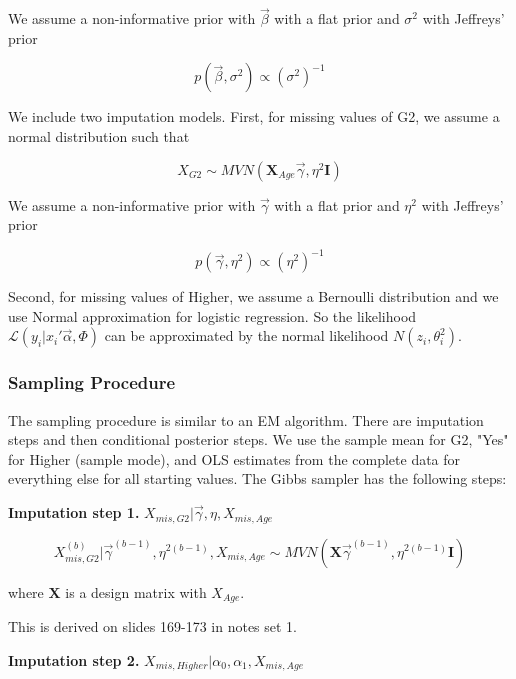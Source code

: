 \documentclass[11pt]{article}
\begin{document}
We assume a non-informative prior with $\vec{\beta}$ with a flat prior and $\sigma^2$ with Jeffreys' prior

$$p(\vec{\beta}, \sigma^2) \propto (\sigma^2)^{-1}$$

\vspace{0.25in}

We include two imputation models. First, for missing values of G2, we assume a normal distribution such that

$$X_{G2} \sim MVN(\mathbf{X}_{Age}\vec{\gamma}, \eta^2\mathbf{I})$$

We assume a non-informative prior with $\vec{\gamma}$ with a flat prior and $\eta^2$ with Jeffreys' prior

$$p(\vec{\gamma}, \eta^2) \propto (\eta^2)^{-1}$$

\vspace{0.25in}

Second, for missing values of Higher, we assume a Bernoulli distribution and we use Normal approximation for logistic regression. So the likelihood $\mathcal{L}(y_i|x_i'\vec\alpha, \Phi)$ can be approximated by the normal likelihood $N(z_i, \theta^2_i)$.

\subsubsection{Sampling Procedure}

The sampling procedure is similar to an EM algorithm. There are imputation steps and then conditional posterior steps. We use the sample mean for G2, "Yes" for Higher (sample mode), and OLS estimates from the complete data for everything else for all starting values. The Gibbs sampler has the following steps:

\vspace{0.25in}

\textbf{Imputation step 1.} $X_{mis, G2}|\vec\gamma, \eta, X_{mis, Age}$

$$X_{mis, G2}^{(b)}|\vec\gamma^{(b - 1)}, \eta^{2(b - 1)}, X_{mis, Age} \sim MVN(\mathbf{X}\vec{\gamma}^{(b - 1)}, \eta^{2(b - 1)}\mathbf{I})$$

where $\mathbf{X}$ is a design matrix with $X_{Age}$.

This is derived on slides 169-173 in notes set 1.

\vspace{0.25in}

\textbf{Imputation step 2.} $X_{mis, Higher}|\alpha_0, \alpha_1, X_{mis, Age}$
\end{document}
